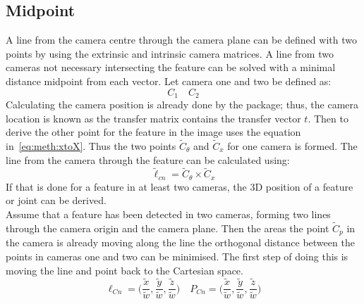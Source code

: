 









\subsection{Midpoint}%
\label{sub:Midpoint}
A line from the camera centre through the camera plane can be defined with two points by using the extrinsic and intrinsic camera matrices.
A line from two cameras not necessary intersecting the feature can be solved with a minimal distance midpoint from each vector.
Let camera one and two be defined as:
\begin{equation}
    C_1 \quad C_2
\end{equation}
Calculating the camera position is already done by the \aruco package; thus, the camera location is known as the transfer matrix contains the transfer vector $t$.
Then to derive the other point for the feature in the image uses the equation in~\ref{eq:meth:xtoX}.
Thus the two points $\tilde{C}_\theta$ and $\tilde{C}_x$ for one camera is formed.
The line from the camera through the feature can be calculated using:
\begin{equation}
    \tilde{\ell}_{cn} = \tilde{C}_\theta \times \tilde{C}_x
\end{equation}
If that is done for a feature in at least two cameras, the 3D position of a feature or joint can be derived.\\
Assume that a feature has been detected in two cameras, forming two lines through the camera origin and the camera plane.
Then the areas the point $\tilde{C}_p$ in the camera is already moving along the line the orthogonal distance between the points in cameras one and two can be minimised.
The first step of doing this is moving the line and point back to the Cartesian space.
\begin{equation}
    \ell_{Cn} = \big( \frac{\tilde x}{\tilde w}, \frac{\tilde y}{\tilde w}, \frac{\tilde z}{\tilde w} \big)
    \quad
    P_{Cn} = \big( \frac{\tilde x}{\tilde w}, \frac{\tilde y}{\tilde w}, \frac{\tilde z}{\tilde w} \big)
\end{equation}


